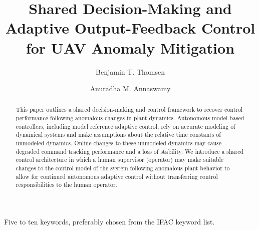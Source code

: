 \documentclass[english]{ifacconf}
\begin{document}
\begin{frontmatter}
	
\title{Shared Decision-Making and Adaptive Output-Feedback Control for UAV Anomaly Mitigation}


\author[First]{Benjamin T. Thomsen} 
\author[First]{Anuradha M. Annaswamy} 

\address[First]{Massachusetts Institute of Technology, 
   Cambridge, MA 02139\\email: [thomsen, aanna]@mit.edu}

\begin{abstract}
This paper outlines a shared decision-making and control framework to recover control performance following anomalous changes in plant dynamics. Autonomous model-based controllers, including model reference adaptive control, rely on accurate modeling of dynamical systems and make assumptions about the relative time constants of unmodeled dynamics. Online changes to these unmodeled dynamics may cause degraded command tracking performance and a loss of stability. We introduce a shared control architecture in which a human supervisor (operator) may make suitable changes to the control model of the system following anomalous plant behavior to allow for continued autonomous adaptive control without transferring control responsibilities to the human operator.
\end{abstract}
\begin{keyword}
Five to ten keywords, preferably chosen from the IFAC keyword list.
\end{keyword}

\end{frontmatter}
\end{document}
